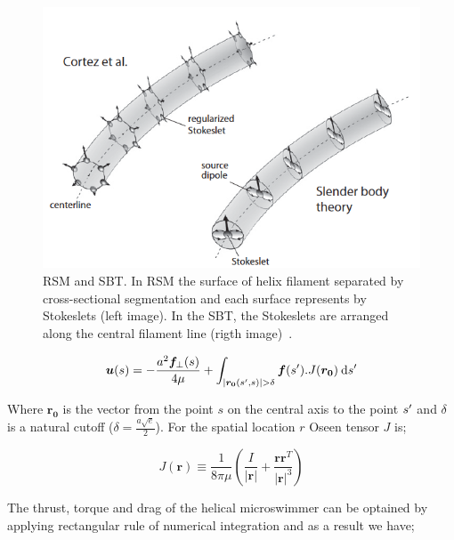 \documentclass[12pt,a4paper,titlepage]{report}
\begin{document}
\begin{figure}
  \centering
    \includegraphics[width=1.0\textwidth]{Stoks}
  \caption{\ac*{RSM} and \ac*{SBT}. In \ac*{RSM} the surface of helix filament separated by 
cross-sectional segmentation and each surface represents by 
Stokeslets (left image). In the \ac*{SBT}, the Stokeslets are arranged along the 
central filament line (rigth image)~\citep{rodenborn2013propulsion}.}
  \label{Stoks}
\end{figure}




\begin{equation}
 \bm{u}(s) = -\frac{a^2 \bm{f}_\perp (s)}{4\mu} + \int_{|\bm{r_0}(s\rq{},s)| > \delta } \bm{f}(s\rq{}).J(\bm{r_0})\: \mathrm{d}s\rq{}
\label{dipole_stokes}
\end{equation}



Where $\bm{r_0}$ is the vector from the point $s$ on the central axis to the point $s\rq{}$ and $\delta$ is
 a natural cutoff ($\delta = \frac{a\sqrt{e}}{2}$). For the spatial location $r$ Oseen tensor $J$ is;

 
\begin{equation}
 J(\bm{r}) \equiv \frac{1}{8\pi \mu} (\frac{I}{|\bm{r}|} + \frac{\bm{rr}^T}{|\bm{r}|^3})
\label{Oseen}
\end{equation}

The thrust, torque and drag of the helical microswimmer can be optained by applying rectangular rule of
numerical integration and as a result we have;
\end{document}

